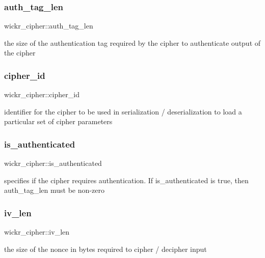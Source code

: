 \subsubsection{\texorpdfstring{auth\+\_\+tag\+\_\+len}{auth\_tag\_len}}
{\footnotesize\ttfamily wickr\+\_\+cipher\+::auth\+\_\+tag\+\_\+len}

the size of the authentication tag required by the cipher to authenticate output of the cipher \mbox{\label{structwickr__cipher_a2ce240f5bd396df05ddd4f30ba944b36}} 
\subsubsection{\texorpdfstring{cipher\+\_\+id}{cipher\_id}}
{\footnotesize\ttfamily wickr\+\_\+cipher\+::cipher\+\_\+id}

identifier for the cipher to be used in serialization / deserialization to load a particular set of cipher parameters \mbox{\label{structwickr__cipher_a21499cb78c9db301261c9d0d647b3e50}} 
\subsubsection{\texorpdfstring{is\+\_\+authenticated}{is\_authenticated}}
{\footnotesize\ttfamily wickr\+\_\+cipher\+::is\+\_\+authenticated}

specifies if the cipher requires authentication. If is\+\_\+authenticated is true, then auth\+\_\+tag\+\_\+len must be non-\/zero \mbox{\label{structwickr__cipher_a1cd39366934a31345d63ff42deeac1e3}} 
\subsubsection{\texorpdfstring{iv\+\_\+len}{iv\_len}}
{\footnotesize\ttfamily wickr\+\_\+cipher\+::iv\+\_\+len}

the size of the nonce in bytes required to cipher / decipher input \mbox{\label{structwickr__cipher_aec5724cc59d20ae5d7cbb73684b53457}} 

